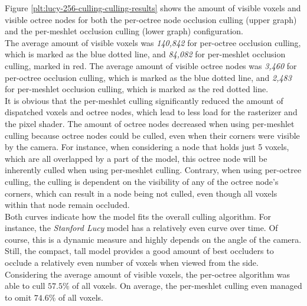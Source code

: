 
\noindent
Figure \ref{plt:lucy-256-culling-culling-results} shows the amount of visible voxels and visible octree 
nodes for both the per-octree node occlusion culling (upper graph) and the per-meshlet occlusion culling 
(lower graph) configuration. \\

The average amount of visible voxels was \emph{140,842} for per-octree occlusion culling, which is marked 
as the blue dotted line, and \emph{84,082} for per-meshlet occlusion culling, marked in red. The average 
amount of visible octree nodes was \emph{3,460} for per-octree occlusion culling, which is marked as the 
blue dotted line, and \emph{2,483} for per-meshlet occlusion culling, which is marked as the red dotted 
line. \\

It is obvious that the per-meshlet culling significantly reduced the amount of dispatched voxels and octree nodes, 
which lead to less load for the rasterizer and the pixel shader. The amount of octree nodes decreased when using 
per-meshlet culling because octree nodes could be culled, even when their corners were visible by the camera. 
For instance, when considering a node that holds just 5 voxels, which are all overlapped by a part of the model, 
this octree node will be inherently culled when using per-meshlet culling. Contrary, when using per-octree culling, 
the culling is dependent on the visibility of any of the octree node's corners, which can result in a node being not 
culled, even though all voxels within that node remain occluded. \\

\noindent 
Both curves indicate how the model fits the overall culling algorithm. For instance, the \emph{Stanford Lucy} 
model has a relatively even curve over time. Of course, this is a dynamic measure and highly depends on the 
angle of the camera. Still, the compact, tall model provides a good amount of best occluders to occlude a 
relatively even number of voxels when viewed from the side. \\

\noindent
Considering the average amount of visible voxels, the per-octree algorithm was able to cull $57.5\%$ of all 
voxels. On average, the per-meshlet culling even managed to omit $74.6\%$ of all voxels. 

